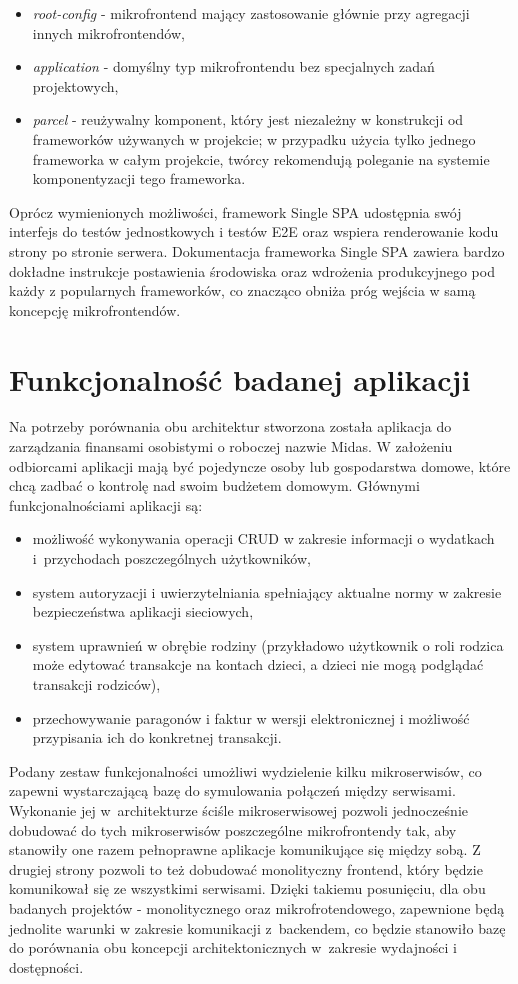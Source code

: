 \documentclass{SGGW-thesis}
\begin{document}
\begin{itemize}
	\item \textit{root-config} - mikrofrontend mający zastosowanie głównie przy agregacji innych mikrofrontendów,
	\item \textit{application} - domyślny typ mikrofrontendu bez specjalnych zadań projektowych,
	\item \textit{parcel} - reużywalny komponent, który jest niezależny w konstrukcji od frameworków używanych w projekcie; w przypadku użycia tylko jednego frameworka w całym projekcie, twórcy rekomendują \cite{singlespa-parcels} poleganie na systemie komponentyzacji tego frameworka.
\end{itemize}

Oprócz wymienionych możliwości, framework Single SPA udostępnia swój interfejs do testów jednostkowych i testów E2E oraz wspiera renderowanie kodu strony po stronie serwera. Dokumentacja frameworka Single SPA zawiera bardzo dokładne instrukcje postawienia środowiska oraz wdrożenia produkcyjnego pod każdy z popularnych frameworków, co znacząco obniża próg wejścia w samą koncepcję mikrofrontendów.

\chapter{Funkcjonalność badanej aplikacji}
Na potrzeby porównania obu architektur stworzona została aplikacja do zarządzania finansami osobistymi o roboczej nazwie Midas. W założeniu odbiorcami aplikacji mają być pojedyncze osoby lub gospodarstwa domowe, które chcą zadbać o kontrolę nad swoim budżetem domowym. Głównymi funkcjonalnościami aplikacji są:

\begin{itemize}
	\item możliwość wykonywania operacji CRUD w zakresie informacji o wydatkach i~przychodach poszczególnych użytkowników,
	\item system autoryzacji i uwierzytelniania spełniający aktualne normy w zakresie bezpieczeństwa aplikacji sieciowych,
	\item system uprawnień w obrębie rodziny (przykładowo użytkownik o roli rodzica może edytować transakcje na kontach dzieci, a dzieci nie mogą podglądać transakcji rodziców),
	\item przechowywanie paragonów i faktur w wersji elektronicznej i możliwość przypisania ich do konkretnej transakcji.
\end{itemize}

Podany zestaw funkcjonalności umożliwi wydzielenie kilku mikroserwisów, co zapewni wystarczającą bazę do symulowania połączeń między serwisami. Wykonanie jej w~architekturze ściśle mikroserwisowej pozwoli jednocześnie dobudować do tych mikroserwisów poszczególne mikrofrontendy tak, aby stanowiły one razem pełnoprawne aplikacje komunikujące się między sobą. Z drugiej strony pozwoli to też dobudować monolityczny frontend, który będzie komunikował się ze wszystkimi serwisami. Dzięki takiemu posunięciu, dla obu badanych projektów - monolitycznego oraz mikrofrotendowego, zapewnione będą jednolite warunki w zakresie komunikacji z~backendem, co będzie stanowiło bazę do porównania obu koncepcji architektonicznych w~zakresie wydajności i dostępności.
\end{document}
